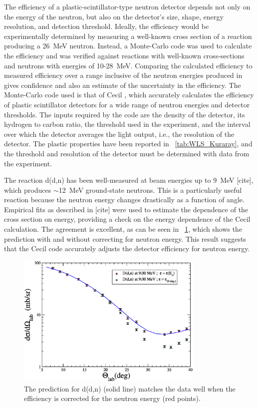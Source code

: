 The efficiency of a plastic-scintillator-type neutron detector depends not only on the energy of the neutron, but also on the detector's size, shape, energy resolution, and detection threshold.  Ideally, the efficiency would be experimentally determined by measuring a well-known cross section of a reaction producing a 26~MeV neutron.  Instead, a Monte-Carlo code was used to calculate the efficiency and was verified against reactions with well-known cross-sections and neutrons with energies of 10-28~MeV.  Comparing the calculated efficiency to measured efficiency over a range inclusive of the neutron energies produced in \reaction gives confidence and also an estimate of the uncertainty in the efficiency.  The Monte-Carlo code used is that of Cecil \cite{Cecil_neutEfficiency}, which accurately calculates the efficiency of plastic scintillator detectors for a wide range of neutron energies and detector thresholds.  The inputs required by the code are the density of the detector, its hydrogen to carbon ratio, the threshold used in the experiment, and the interval over which the detector averages the light output, i.e., the resolution of the detector.  The plastic properties have been reported in {\tab}~\ref{tab:WLS_Kuraray}, and the threshold and resolution of the detector must be determined with data from the experiment.  

The reaction d(d,n) has been well-measured at beam energies up to 9~MeV [cite], which produces $\sim$12~MeV ground-state neutrons.  This is a particularly useful reaction because the neutron energy changes drastically as a function of angle.  Empirical fits as described in [cite] were used to estimate the dependence of the cross section on energy, providing a check on the energy dependence of the Cecil calculation.  The agreement is excellent, as can be seen in {\fig}~\ref{fig:DeuteriumMatch}, which shows the prediction with and without correcting for neutron energy.  This result suggests that the Cecil code accurately adjusts the detector efficiency for neutron energy.  
\begin{figure}[!htbp]
\centering
\includegraphics[width=0.8\textwidth]{figures/deuteriumMatch.eps}
\caption{The prediction for d(d,n) (solid line) matches the data well when the efficiency is corrected for the neutron energy (red points).}
\label{fig:DeuteriumMatch}
\end{figure}

